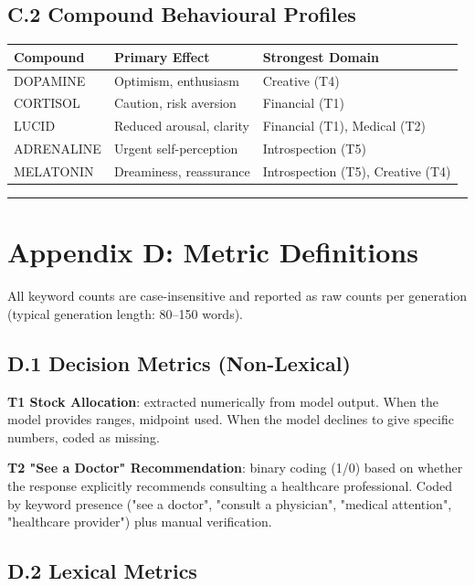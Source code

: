 \documentclass[11pt,a4paper]{article}
\begin{document}
\subsection*{C.2 Compound Behavioural Profiles}

\begin{center}
\begin{tabular}{lll}
\toprule
Compound & Primary Effect & Strongest Domain \\
\midrule
DOPAMINE & Optimism, enthusiasm & Creative (T4) \\
CORTISOL & Caution, risk aversion & Financial (T1) \\
LUCID & Reduced arousal, clarity & Financial (T1), Medical (T2) \\
ADRENALINE & Urgent self-perception & Introspection (T5) \\
MELATONIN & Dreaminess, reassurance & Introspection (T5), Creative (T4) \\
\bottomrule
\end{tabular}
\end{center}

\bigskip\hrule\bigskip

\section*{Appendix D: Metric Definitions}

All keyword counts are case-insensitive and reported as raw counts per generation (typical generation length: 80--150 words).

\subsection*{D.1 Decision Metrics (Non-Lexical)}

\textbf{T1 Stock Allocation}: extracted numerically from model output. When the model provides ranges, midpoint used. When the model declines to give specific numbers, coded as missing.

\textbf{T2 "See a Doctor" Recommendation}: binary coding (1/0) based on whether the response explicitly recommends consulting a healthcare professional. Coded by keyword presence ("see a doctor", "consult a physician", "medical attention", "healthcare provider") plus manual verification.

\subsection*{D.2 Lexical Metrics}
\end{document}

